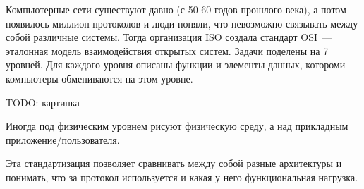 

Компьютерные сети существуют давно (с 50-60 годов прошлого века), а потом появилось миллион протоколов и люди поняли, что невозможно связывать между собой различные системы. Тогда организация ISO создала стандарт OSI~--- эталонная модель взаимодействия открытых систем. Задачи поделены на 7 уровней. Для каждого уровня описаны функции и элементы данных, котороми компьютеры обмениваются на этом уровне.

TODO: картинка

Иногда под физическим уровнем рисуют физическую среду, а над прикладным приложение/пользователя.

Эта стандартизация позволяет сравнивать между собой разные архитектуры и понимать, что за протокол используется и какая у него функциональная нагрузка.

